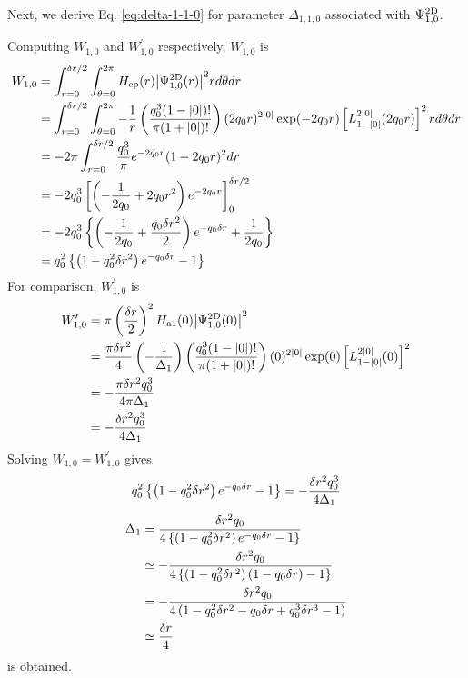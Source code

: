 \documentclass[a4paper,11pt]{article}
\begin{document}
Next, we derive Eq. \eqref{eq:delta-1-1-0} for parameter
$\Delta_{1,1,0}$ associated with $\Psi^{\mathrm{2D}}_{1,0}$.

Computing $W_{1,0}$ and $W_{1,0}^\prime$ respectively, $W_{1,0}$ is
\begin{align}
  W_{1,0}
   &= \int_{r=0}^{\delta r/2}\int_{\theta=0}^{2\pi}
      H_{\mathrm{ep}}(r){\left| \Psi^{\mathrm{2D}}_{1,0}(r) \right|}^2rd\theta dr\notag\\
   &= \int_{r=0}^{\delta r/2}\int_{\theta=0}^{2\pi}
      -\frac{1}{r}\left(\frac{q_0^3(1-{\left| 0 \right|})!}{\pi(1+{\left| 0 \right|})!}\right)
      (2q_0r)^{2{\left| 0 \right|}}\exp(-2q_0r)
      \left[L_{1-{\left| 0 \right|}}^{2{\left| 0 \right|}}(2q_0r)\right]^2 rd\theta dr\notag\\
   &= -2\pi\int_{r=0}^{\delta r/2}\frac{q_0^3}{\pi}e^{-2q_0r}(1-2q_0r)^2dr\notag\\
   &= -2q_0^3\left[\left(-\frac{1}{2q_0}+2q_0r^2\right)e^{-2q_0r}\right]_{0}^{\delta r/2} \notag\\
   &= -2q_0^3\left\{\left(-\frac{1}{2q_0}+\frac{q_0\delta r^2}{2}\right)e^{-q_0\delta r}+\frac{1}{2q_0}\right\}\notag\\
   &= q_0^2\left\{\left(1-q_0^2\delta r^2\right)e^{-q_0\delta r}-1\right\}
\end{align}
For comparison, $W_{1,0}^\prime$ is
\begin{align}
    W_{1,0}^\prime
    &=\pi\left(\frac{\delta r}{2}\right)^2
         H_{\mathrm{a1}}(0){\left| \Psi^{\mathrm{2D}}_{1,0}(0) \right|}^2\notag\\
    &=\frac{\pi\delta r^2}{4}\left(-\frac{1}{\Delta_1}\right)
    \left(\frac{q_0^3(1-{\left| 0 \right|})!}{\pi(1+{\left| 0 \right|})!}\right)
    (0)^{2{\left| 0 \right|}}\exp(0)\left[L_{1-{\left| 0 \right|}}^{2{\left| 0 \right|}}(0)\right]^2\notag\\
    &= -\frac{\pi\delta r^2q_0^3}{4\pi\Delta_1}\notag\\
    &= -\frac{\delta r^2q_0^3}{4\Delta_1}
\end{align}
Solving $W_{1,0}=W_{1,0}^\prime$ gives
\begin{equation}
q_0^2\left\{\left(1-q_0^2\delta r^2\right)e^{-q_0\delta r}-1\right\}
=-\frac{\delta r^2q_0^3}{4\Delta_1}
\end{equation}
\begin{align}
\Delta_1&=\frac{\delta r^2q_0}{4\left\{\left(1-q_0^2\delta r^2\right)e^{-q_0\delta r}-1\right\}}\notag\\
&\simeq-\frac{\delta r^2q_0}{4\left\{\left(1-q_0^2\delta r^2\right)(1-q_0\delta r)-1\right\}}\notag\\
&=-\frac{\delta r^2q_0}{4\left(1-q_0^2\delta r^2-q_0\delta r+q_0^3\delta r^3-1\right)}\notag\\
&\simeq\frac{\delta r}{4}
\end{align}
is obtained.
\end{document}
